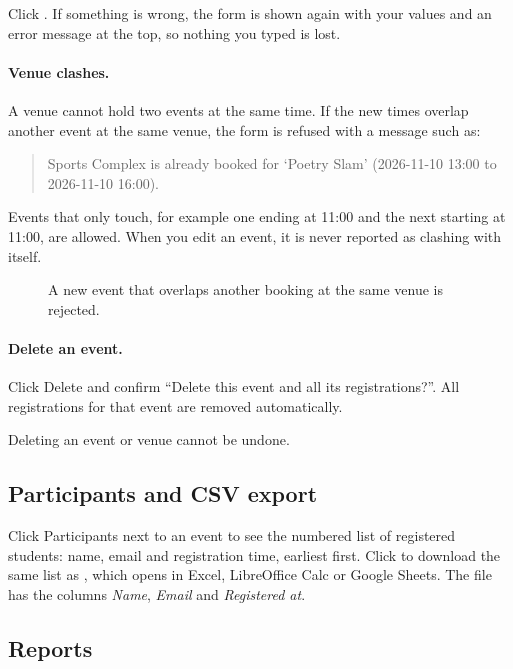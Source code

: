 \documentclass[11pt,a4paper]{article}
\begin{document}
Click . If something is wrong, the form is shown again with your values and an error
message at the top, so nothing you typed is lost.

\paragraph{Venue clashes.} A venue cannot hold two events at the same time. If the new times overlap
another event at the same venue, the form is refused with a message such as:

\begin{quote}\small
Sports Complex is already booked for `Poetry Slam' (2026-11-10 13:00 to 2026-11-10 16:00).
\end{quote}

Events that only touch, for example one ending at 11:00 and the next starting at 11:00, are
allowed. When you edit an event, it is never reported as clashing with itself.

\begin{figure}[H]
\centering
{}
\caption{A new event that overlaps another booking at the same venue is rejected.}
\end{figure}

\paragraph{Delete an event.} Click \textsf{Delete} and confirm ``Delete this event and all its
registrations?''. All registrations for that event are removed automatically.

\begin{warning}
Deleting an event or venue cannot be undone.
\end{warning}

\subsection{Participants and CSV export}

Click \textsf{Participants} next to an event to see the numbered list of registered students: name,
email and registration time, earliest first. Click  to download the same list as
, which opens in Excel, LibreOffice Calc or Google Sheets. The file
has the columns \emph{Name}, \emph{Email} and \emph{Registered at}.

\subsection{Reports}
\end{document}
